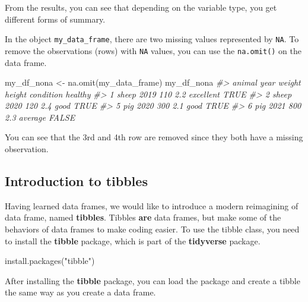 \documentclass[
]{book}
\newenvironment{Shaded}{\begin{snugshade}}{\end{snugshade}}
\newcommand{\CommentTok}[1]{\textcolor[rgb]{0.56,0.35,0.01}{\textit{#1}}}
\newcommand{\FunctionTok}[1]{\textcolor[rgb]{0.00,0.00,0.00}{#1}}
\newcommand{\NormalTok}[1]{#1}
\newcommand{\OtherTok}[1]{\textcolor[rgb]{0.56,0.35,0.01}{#1}}
\newcommand{\StringTok}[1]{\textcolor[rgb]{0.31,0.60,0.02}{#1}}
\begin{document}
From the results, you can see that depending on the variable type, you get different forms of summary.

In the object \texttt{my\_data\_frame}, there are two missing values represented by \texttt{NA}. To remove the observations (rows) with \texttt{NA} values, you can use the \texttt{na.omit()} on the data frame.

\begin{Shaded}
\begin{Highlighting}[]
\NormalTok{my\_df\_nona }\OtherTok{\textless{}{-}} \FunctionTok{na.omit}\NormalTok{(my\_data\_frame)}
\NormalTok{my\_df\_nona}
\CommentTok{\#\textgreater{}   animal year weight height condition healthy}
\CommentTok{\#\textgreater{} 1  sheep 2019    110    2.2 excellent    TRUE}
\CommentTok{\#\textgreater{} 2  sheep 2020    120    2.4      good    TRUE}
\CommentTok{\#\textgreater{} 5    pig 2020    300    2.1      good    TRUE}
\CommentTok{\#\textgreater{} 6    pig 2021    800    2.3   average   FALSE}
\end{Highlighting}
\end{Shaded}

You can see that the 3rd and 4th row are removed since they both have a missing observation.

\hypertarget{introduction-to-tibbles}{%
\subsection{Introduction to tibbles}\label{introduction-to-tibbles}}

Having learned data frames, we would like to introduce a modern reimagining of data frame, named \textbf{tibbles}. Tibbles \textbf{are} data frames, but make some of the behaviors of data frames to make coding easier. To use the tibble class, you need to install the \textbf{tibble} package, which is part of the \textbf{tidyverse} package.

\begin{Shaded}
\begin{Highlighting}[]
\FunctionTok{install.packages}\NormalTok{(}\StringTok{"tibble"}\NormalTok{)}
\end{Highlighting}
\end{Shaded}

After installing the \textbf{tibble} package, you can load the package and create a tibble the same way as you create a data frame.
\end{document}
